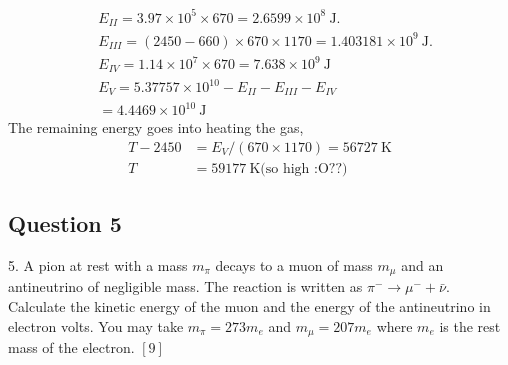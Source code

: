 \documentclass{article}
\begin{document}
\begin{equation}
	\begin{aligned}
		&E_{II}=3.97 \times 10^{5} \times 670=2.6599 \times 10^{8} \mathrm{~J} .\\
		&E_{III}=(2450-660) \times 670 \times 1170 =1.403181 \times 10^{9} \mathrm{~J} .\\
		&E_{IV}=1.14 \times 10^{7} \times 670=7.638 \times 10^{9} \mathrm{~J}\\
		&E_{V}=5.37757 \times 10^{10}-E_{II}-E_{III}-E_{IV}\\
		&=4.4469 \times 10^{10} \mathrm{~J}
	\end{aligned}
\end{equation}
The remaining energy goes into heating the gas,
\begin{equation}
	\begin{aligned}
		T - {2450}&=E_{V} / (670 \times 1170) =56727 \mathrm{~K} \\
		T &= 59177 \mathrm{~K} \text {(so high :O??)}
	\end{aligned}
\end{equation}

\subsection{Question 5}
5. A pion at rest with a mass $m_{\pi}$ decays to a muon of mass $m_{\mu}$ and an antineutrino of negligible mass. The reaction is written as $\pi^{-} \rightarrow \mu^{-}+\bar{\nu}$. Calculate the kinetic energy of the muon and the energy of the antineutrino in electron volts. You may take $m_{\pi}=273 m_{e}$ and $m_{\mu}=207 m_{e}$ where $m_{e}$ is the rest mass of the electron.
$[9]$
\end{document}
